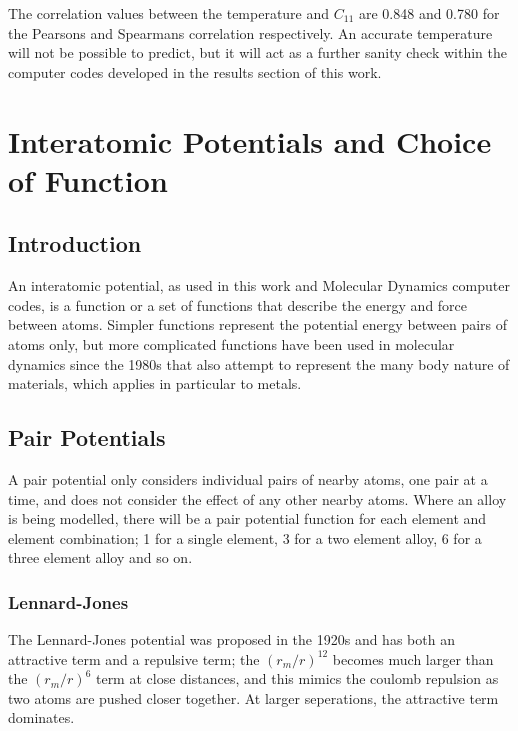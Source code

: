 The correlation values between the temperature and $C_{11}$ are 0.848 and 0.780 for the Pearsons and Spearmans correlation respectively.  An accurate temperature will not be possible to predict, but it will act as a further sanity check within the computer codes developed in the results section of this work.



\FloatBarrier
\section[Choice of Function]{Interatomic Potentials and Choice of Function}

\subsection{Introduction}

An interatomic potential, as used in this work and Molecular Dynamics computer codes, is a function or a set of functions that describe the energy and force between atoms.  Simpler functions represent the potential energy between pairs of atoms only, but more complicated functions have been used in molecular dynamics since the 1980s that also attempt to represent the many body nature of materials, which applies in particular to metals.


\subsection{Pair Potentials}

A pair potential only considers individual pairs of nearby atoms, one pair at a time, and does not consider the effect of any other nearby atoms.  Where an alloy is being modelled, there will be a pair potential function for each element and element combination; 1 for a single element, 3 for a two element alloy, 6 for a three element alloy and so on.


\FloatBarrier
\subsubsection{Lennard-Jones}
\label{section:LennardJones}

The Lennard-Jones potential was proposed in the 1920s and has both an attractive term and a repulsive term; the $(r_m/r)^{12}$ becomes much larger than the $(r_m/r)^6$ term at close distances, and this mimics the coulomb repulsion as two atoms are pushed closer together.  At larger seperations, the attractive term dominates.

